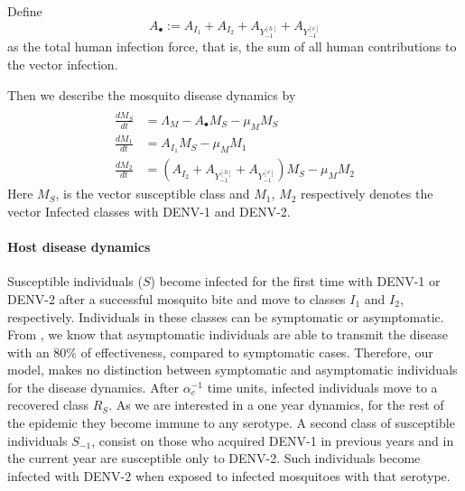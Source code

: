     Define
    $$
        A_{\bullet}:=
            A_{I_1} + A_{I_2} + A_{Y_{-1}^{[h]}} + 
            A_{Y_{-1}^{[c]}}
    $$
    as the total human infection force, that is, 
    the sum of all
    human contributions to the vector infection. 

    Then we describe the mosquito disease dynamics 
    by 
    \begin{equation}
        \begin{aligned}
            \\
            \frac{dM_S}{dt}&=
                \Lambda_M
                - A_{\bullet} M_S
                - \mu_M M_S
            \\
            \frac{dM_1}{dt}&=
                A_{I_1}  M_S - \mu_M M_1
            \\
            \frac{dM_2}{dt} &=
                \left(
                    A_{I_2}+A_{Y_{-1}^{[h]}}+A_{Y_{-1}^{[c]}}
                \right) 
                M_S-\mu_M M_2
        \end{aligned}
    \end{equation}
    Here $M_S$, is the vector susceptible class and
    $M_1$, $M_2$ respectively denotes the vector 
    Infected classes with \ac{DENV-1}
    and \ac{DENV-2}. 
    
    \paragraph{Host disease dynamics}
        Susceptible individuals ($S$) become infected for the first time
        with DENV-1 or DENV-2 after a successful mosquito bite and move
        to classes $I_1$ and $I_2$, respectively. Individuals in these classes can 
        be symptomatic or asymptomatic. From \cite{Bosch2018}, we know that asymptomatic 
        individuals are able to transmit the disease with an $80\%$ of effectiveness, compared 
        to symptomatic cases. Therefore, our model, makes no distinction between symptomatic and asymptomatic individuals for the disease dynamics. 
        After $\alpha_c^{-1}$ time units, infected individuals move to a recovered class $R_S$.  
        As we are interested in a one year dynamics, for the rest of the epidemic they become immune to
        any serotype. A second class of susceptible individuals $S_{-1}$,
        consist on those who acquired DENV-1 in previous years and in the
        current year are susceptible only to DENV-2. Such individuals
        become infected with DENV-2 when exposed to infected mosquitoes
        with that serotype. 
        
